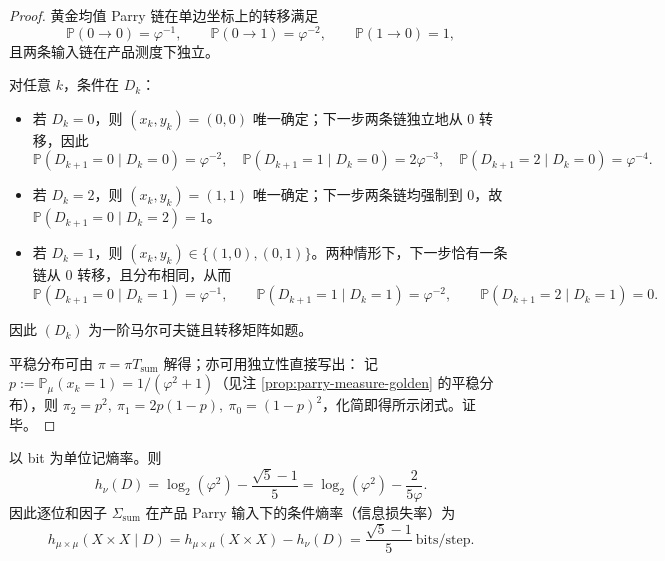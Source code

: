 \begin{proof}
黄金均值 Parry 链在单边坐标上的转移满足
\[
\mathbb{P}(0\to 0)=\varphi^{-1},\qquad
\mathbb{P}(0\to 1)=\varphi^{-2},\qquad
\mathbb{P}(1\to 0)=1,
\]
且两条输入链在产品测度下独立。

对任意 $k$，条件在 $D_k$：
\begin{itemize}
  \item 若 $D_k=0$，则 $(x_k,y_k)=(0,0)$ 唯一确定；下一步两条链独立地从 $0$ 转移，因此
  \[
  \mathbb{P}(D_{k+1}=0\mid D_k=0)=\varphi^{-2},\quad
  \mathbb{P}(D_{k+1}=1\mid D_k=0)=2\varphi^{-3},\quad
  \mathbb{P}(D_{k+1}=2\mid D_k=0)=\varphi^{-4}.
  \]
  \item 若 $D_k=2$，则 $(x_k,y_k)=(1,1)$ 唯一确定；下一步两条链均强制到 $0$，故 $\mathbb{P}(D_{k+1}=0\mid D_k=2)=1$。
  \item 若 $D_k=1$，则 $(x_k,y_k)\in\{(1,0),(0,1)\}$。两种情形下，下一步恰有一条链从 $0$ 转移，且分布相同，从而
  \[
  \mathbb{P}(D_{k+1}=0\mid D_k=1)=\varphi^{-1},\qquad
  \mathbb{P}(D_{k+1}=1\mid D_k=1)=\varphi^{-2},\qquad
  \mathbb{P}(D_{k+1}=2\mid D_k=1)=0.
  \]
\end{itemize}
因此 $(D_k)$ 为一阶马尔可夫链且转移矩阵如题。

平稳分布可由 $\pi=\pi T_{\mathrm{sum}}$ 解得；亦可用独立性直接写出：
记 $p:=\mathbb{P}_\mu(x_k=1)=1/(\varphi^2+1)$（见注 \ref{prop:parry-measure-golden} 的平稳分布），则
\(
\pi_2=p^2,\ \pi_1=2p(1-p),\ \pi_0=(1-p)^2
\)，化简即得所示闭式。证毕。
\end{proof}

\begin{proposition}\label{prop:real-input-digitwise-sum-information-loss-rate}
以 bit 为单位记熵率。则
\[
h_\nu(D)=\log_2(\varphi^2)-\frac{\sqrt5-1}{5}
=\log_2(\varphi^2)-\frac{2}{5\varphi}.
\]
因此逐位和因子 $\Sigma_{\mathrm{sum}}$ 在产品 Parry 输入下的条件熵率（信息损失率）为
\[
h_{\mu\times\mu}(X\times X\mid D)
=h_{\mu\times\mu}(X\times X)-h_\nu(D)
=\frac{\sqrt5-1}{5}\ \text{bits/step}.
\]
\end{proposition}

